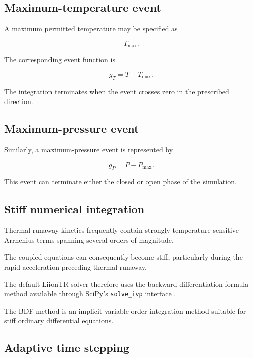 \subsection{Maximum-temperature event}

A maximum permitted temperature may be specified as

\begin{equation}
    T_{\max}.
\end{equation}

The corresponding event function is

\begin{equation}
    g_T
    =
    T-T_{\max}.
    \label{eq:max_temperature_event}
\end{equation}

The integration terminates when the event crosses zero in the prescribed
direction.


\subsection{Maximum-pressure event}

Similarly, a maximum-pressure event is represented by

\begin{equation}
    g_P
    =
    P-P_{\max}.
    \label{eq:max_pressure_event}
\end{equation}

This event can terminate either the closed or open phase of the
simulation.


\subsection{Stiff numerical integration}

Thermal runaway kinetics frequently contain strongly temperature-sensitive
Arrhenius terms spanning several orders of magnitude.

The coupled equations can consequently become stiff, particularly during
the rapid acceleration preceding thermal runaway.

The default LiionTR solver therefore uses the backward differentiation
formula method available through SciPy's \texttt{solve\_ivp} interface
\parencite{virtanen2020scipy}.

The BDF method is an implicit variable-order integration method suitable
for stiff ordinary differential equations.


\subsection{Adaptive time stepping}

